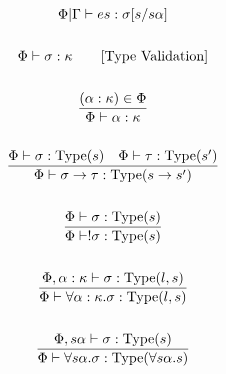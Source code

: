 \documentclass {article}
\begin{document}
\begin{gather*}
{\Phi | \Gamma \vdash e s : \sigma [s/s \alpha]} \\
\\
\Phi \vdash \sigma : \kappa \tag* {[\text{Type Validation}]} \\
\\
\frac
{(\alpha : \kappa) \in \Phi}
{\Phi \vdash \alpha : \kappa} \\
\\
\frac
{\Phi \vdash \sigma : \text{Type} (s) \quad \Phi \vdash \tau : \text{Type} (s')}
{\Phi \vdash \sigma \to \tau : \text{Type} (s \to s')} \\
\\
\frac
{\Phi \vdash \sigma : \text{Type} (s)}
{\Phi \vdash !\sigma : \text{Type} (s)} \\
\\
\frac
{\Phi, \alpha : \kappa \vdash \sigma : \text{Type}(l,s) }
{\Phi \vdash \forall \alpha : \kappa. \sigma : \text{Type} (l,s) } \\
\\
\frac
{\Phi, s \alpha \vdash \sigma : \text{Type} (s) }
{\Phi \vdash \forall s \alpha. \sigma : \text{Type} (\forall s \alpha. s) } \\
\\
\end{gather*}
\end{document}
